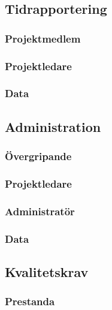 \documentclass[a4paper]{article}
\begin{document}







\subsection{Tidrapportering}

\subsubsection{Projektmedlem}

\subsubsection{Projektledare}

\subsubsection{Data}








\subsection{Administration}
\subsubsection{Övergripande}

\subsubsection{Projektledare}

\subsubsection{Administratör}

\subsubsection{Data}


\subsection{Kvalitetskrav}

\subsubsection{Prestanda}

\end{document}
